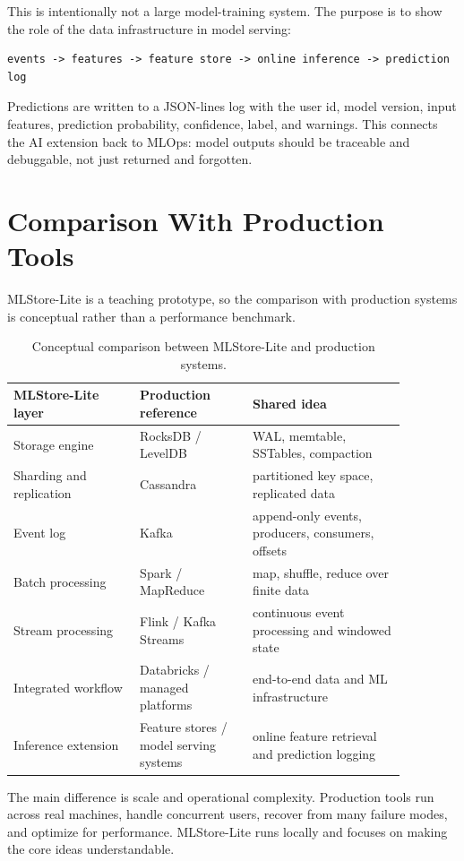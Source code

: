 This is intentionally not a large model-training system. The purpose is to show
the role of the data infrastructure in model serving:

\begin{verbatim}
events -> features -> feature store -> online inference -> prediction log
\end{verbatim}

Predictions are written to a JSON-lines log with the user id, model version,
input features, prediction probability, confidence, label, and warnings. This
connects the AI extension back to MLOps: model outputs should be traceable and
debuggable, not just returned and forgotten.

\section{Comparison With Production Tools}

MLStore-Lite is a teaching prototype, so the comparison with production systems
is conceptual rather than a performance benchmark.

\begin{table}[H]
\centering
\begin{tabular}{p{0.28\linewidth} p{0.25\linewidth} p{0.34\linewidth}}
\hline
\textbf{MLStore-Lite layer} & \textbf{Production reference} & \textbf{Shared idea} \\
\hline
Storage engine & RocksDB / LevelDB & WAL, memtable, SSTables, compaction \\
Sharding and replication & Cassandra & partitioned key space, replicated data \\
Event log & Kafka & append-only events, producers, consumers, offsets \\
Batch processing & Spark / MapReduce & map, shuffle, reduce over finite data \\
Stream processing & Flink / Kafka Streams & continuous event processing and windowed state \\
Integrated workflow & Databricks / managed platforms & end-to-end data and ML infrastructure \\
Inference extension & Feature stores / model serving systems & online feature retrieval and prediction logging \\
\hline
\end{tabular}
\caption{Conceptual comparison between MLStore-Lite and production systems.}
\end{table}

The main difference is scale and operational complexity. Production tools run
across real machines, handle concurrent users, recover from many failure modes,
and optimize for performance. MLStore-Lite runs locally and focuses on making
the core ideas understandable.

